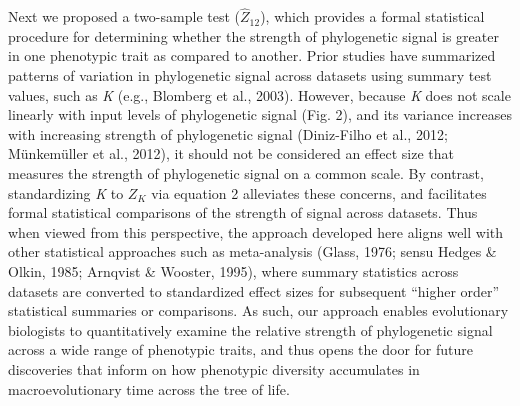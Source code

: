\documentclass[
]{article}
\begin{document}
Next we proposed a two-sample test (\(\hat{Z}_{12}\)), which provides a
formal statistical procedure for determining whether the strength of
phylogenetic signal is greater in one phenotypic trait as compared to
another. Prior studies have summarized patterns of variation in
phylogenetic signal across datasets using summary test values, such as
\emph{K} (e.g., Blomberg et al., 2003). However, because \emph{K} does
not scale linearly with input levels of phylogenetic signal (Fig. 2),
and its variance increases with increasing strength of phylogenetic
signal (Diniz-Filho et al., 2012; Münkemüller et al., 2012), it should
not be considered an effect size that measures the strength of
phylogenetic signal on a common scale. By contrast, standardizing
\emph{K} to \(Z_K\) via equation 2 alleviates these concerns, and
facilitates formal statistical comparisons of the strength of signal
across datasets. Thus when viewed from this perspective, the approach
developed here aligns well with other statistical approaches such as
meta-analysis (Glass, 1976; sensu Hedges \& Olkin, 1985; Arnqvist \&
Wooster, 1995), where summary statistics across datasets are converted
to standardized effect sizes for subsequent ``higher order'' statistical
summaries or comparisons. As such, our approach enables evolutionary
biologists to quantitatively examine the relative strength of
phylogenetic signal across a wide range of phenotypic traits, and thus
opens the door for future discoveries that inform on how phenotypic
diversity accumulates in macroevolutionary time across the tree of life.
\hfill\break
\end{document}
